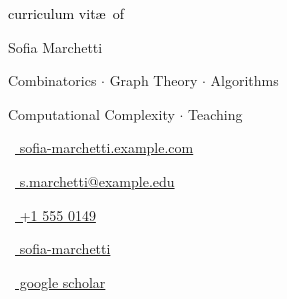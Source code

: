 \begin{scriptsize}
	 \textcolor{black}{curriculum vit\ae~of}
\end{scriptsize}

\vspace*{-0.10em}
\begin{Large}
	Sofia Marchetti
\end{Large}

\vspace*{0.25em}
\begin{scshape}
	\begin{footnotesize}
		  \textcolor{highlight2}{Combinatorics $\cdot$ Graph Theory $\cdot$ Algorithms}

		  \vspace*{-1ex}
		  \textcolor{highlight2}{Computational Complexity $\cdot$ Teaching}
	\end{footnotesize}
\end{scshape}
\vspace*{0.4cm}

\begin{footnotesize}
	\begin{tiny}\faHome\end{tiny}~\href{https://sofia-marchetti.example.com}{
		sofia-marchetti.example.com
	}
	\quad \begin{tiny}\faEnvelope[regular]\end{tiny}~\href{mailto:s.marchetti@example.edu}{%
		s.marchetti@example.edu
	}

	\begin{tiny}\faMobile*\end{tiny}~\href{tel:0015550149}{
		+1 555 0149
	}
	\quad
	\begin{tiny}\faLinkedinIn\end{tiny}~\href{https://www.linkedin.com/in/sofia-marchetti/}{
		sofia-marchetti
	}
	\quad
	\begin{tiny}\faGraduationCap\end{tiny}~\href{https://scholar.example.edu/citations?user=placeholder}{
		 google scholar
		}

\end{footnotesize}
